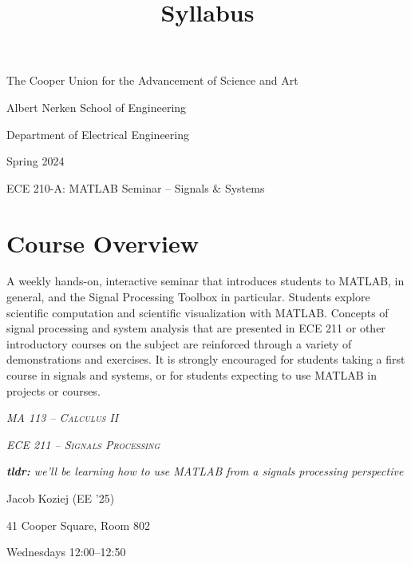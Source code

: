 \documentclass{article}
\title{Syllabus}
\begin{document}
\renderTitle

\scshape
\slshape

\begin{Centering}
\noindent
The Cooper Union for the Advancement of Science and Art

\noindent
Albert Nerken School of Engineering

\noindent
Department of Electrical Engineering

\noindent
Spring 2024

\leavevmode
\newline

\noindent
ECE 210-A: MATLAB Seminar -- Signals \& Systems

\end{Centering}

\normalfont

\section{Course Overview}


\begin{displayquote}
	A weekly hands-on, interactive seminar that introduces students
	to MATLAB, in general, and the Signal Processing Toolbox in
	particular.  Students explore scientific computation and
	scientific visualization with MATLAB.  Concepts of signal
	processing and system analysis that are presented in ECE 211 or
	other introductory courses on the subject are reinforced through
	a variety of demonstrations and exercises.  It is strongly
	encouraged for students taking a first course in signals and
	systems, or for students expecting to use MATLAB in projects or
	courses.

	\footnotesize

	\noindent
	 \textsc{\textsl{MA 113 -- Calculus II}}

	\noindent
	 \textsc{\textsl{ECE 211 -- Signals
	Processing}}

	\noindent
	\textsl{\textbf{tldr:} we'll be learning how to use MATLAB from
	a signals processing perspective}
\end{displayquote}

\noindent
{} Jacob Koziej (EE '25)

\noindent
{} 41 Cooper Square, Room 802

\noindent
{} Wednesdays 12:00--12:50
\end{document}
